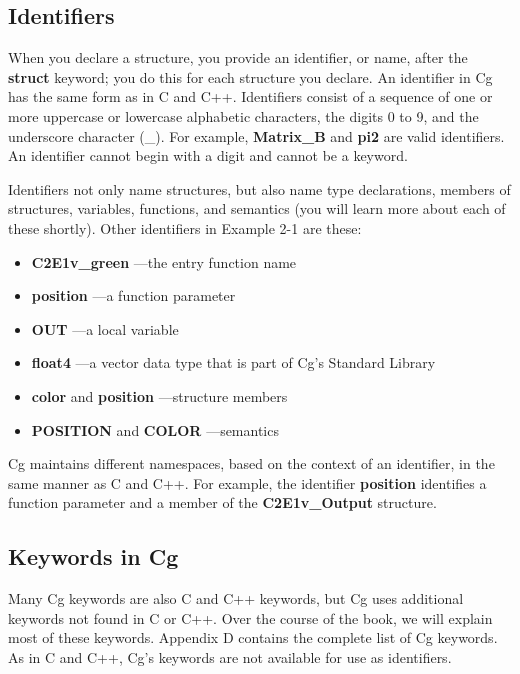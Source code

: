 \documentclass{book}
\begin{document}
\subsection{Identifiers}

When you declare a structure, you provide an identifier, or name, after the \textbf{struct} keyword; you do this for each structure you declare. An identifier in Cg has the same form as in C and C++. Identifiers consist of a sequence of one or more uppercase or lowercase alphabetic characters, the digits 0 to 9, and the underscore character (_). For example, \textbf{Matrix_B} and \textbf{pi2} are valid identifiers. An identifier cannot begin with a digit and cannot be a keyword.

Identifiers not only name structures, but also name type declarations, members of structures, variables, functions, and semantics (you will learn more about each of these shortly). Other identifiers in Example 2-1 are these:

\FloatBarrier
\begin{itemize}
\item \textbf{C2E1v_green} —the entry function name
\item \textbf{position} —a function parameter
\item \textbf{OUT} —a local variable
\item \textbf{float4} —a vector data type that is part of Cg's Standard Library
\item \textbf{color} and \textbf{position} —structure members
\item \textbf{POSITION} and \textbf{COLOR} —semantics
\end{itemize}
\FloatBarrier

Cg maintains different namespaces, based on the context of an identifier, in the same manner as C and C++. For example, the identifier \textbf{position} identifies a function parameter and a member of the \textbf{C2E1v_Output} structure.

\subsection*{Keywords in Cg}

Many Cg keywords are also C and C++ keywords, but Cg uses additional keywords not found in C or C++. Over the course of the book, we will explain most of these keywords. Appendix D contains the complete list of Cg keywords. As in C and C++, Cg's keywords are not available for use as identifiers.
\end{document}
